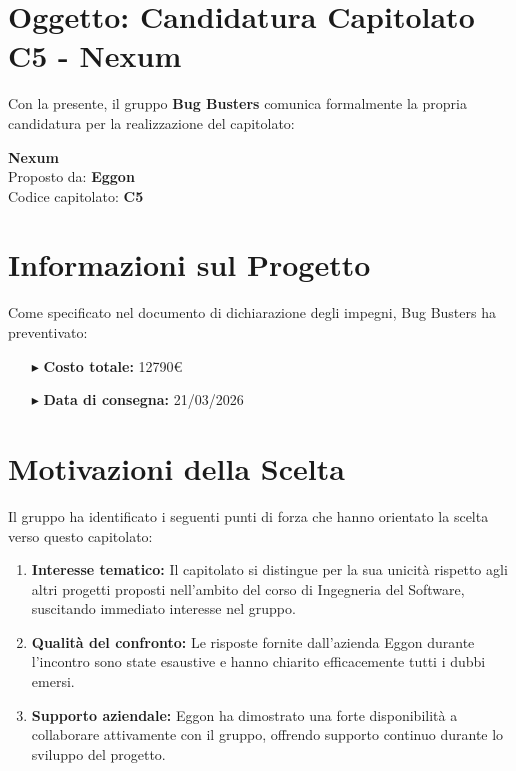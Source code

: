 \documentclass[a4paper,11pt]{article}
\begin{document}
\vspace{2em}

\section*{Oggetto: Candidatura Capitolato C5 - Nexum}

Con la presente, il gruppo \textbf{Bug Busters} comunica formalmente la propria candidatura per la realizzazione del capitolato:

\begin{center}
    {\Large\textbf{Nexum}}\\[0.3cm]
    Proposto da: \textbf{Eggon}\\
    Codice capitolato: \textbf{C5}
\end{center}

\vspace{1.5em}

\section*{Informazioni sul Progetto}

Come specificato nel documento di dichiarazione degli impegni, Bug Busters ha preventivato:

\begin{itemize}[leftmargin=2cm, itemsep=0.5em]
    \item[\textcolor{primarycolor}{$\blacktriangleright$}] \textbf{Costo totale:} 12790€
    \item[\textcolor{primarycolor}{$\blacktriangleright$}] \textbf{Data di consegna:} 21/03/2026
\end{itemize}

\vspace{1.5em}

\section*{Motivazioni della Scelta}

Il gruppo ha identificato i seguenti punti di forza che hanno orientato la scelta verso questo capitolato:

\begin{enumerate}[leftmargin=2cm, itemsep=0.8em]
    \item \textbf{Interesse tematico:} Il capitolato si distingue per la sua unicità rispetto agli altri progetti proposti nell'ambito del corso di Ingegneria del Software, suscitando immediato interesse nel gruppo.
    
    \item \textbf{Qualità del confronto:} Le risposte fornite dall'azienda Eggon durante l'incontro sono state esaustive e hanno chiarito efficacemente tutti i dubbi emersi.
    
    \item \textbf{Supporto aziendale:} Eggon ha dimostrato una forte disponibilità a collaborare attivamente con il gruppo, offrendo supporto continuo durante lo sviluppo del progetto.
\end{enumerate}
\end{document}
